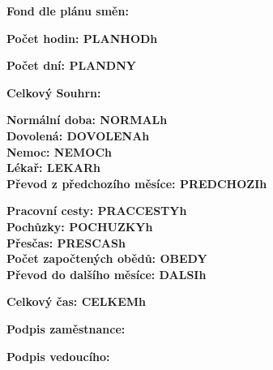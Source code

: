 \documentclass[10pt, a4paper]{article}%
\begin{document}
    
\begin{flushleft}%
    \Large\textbf{Fond dle plánu směn:\\}
    \vspace{0.3cm}

    \begin{minipage}{0.49\textwidth}
        \normalsize\textbf{Počet hodin: PLANHODh}\\
    \end{minipage}
    \hfill
    \begin{minipage}{0.49\textwidth}
        \normalsize\textbf{Počet dní: PLANDNY}\\

    \end{minipage}

    \vspace{0.3cm}
    \Large\textbf{Celkový Souhrn:\\}
    \vspace{0.3cm}

    \begin{minipage}{0.49\textwidth}
        \normalsize\textbf{Normální doba: NORMALh}\\
        \normalsize\textbf{Dovolená: DOVOLENAh}\\
        \normalsize\textbf{Nemoc: NEMOCh}\\
        \normalsize\textbf{Lékař: LEKARh}\\
        \normalsize\textbf{Převod z předchozího měsíce: PREDCHOZIh}
    \end{minipage}
    \hfill
    \begin{minipage}{0.49\textwidth}
        \normalsize\textbf{Pracovní cesty: PRACCESTYh}\\
        \normalsize\textbf{Pochůzky: POCHUZKYh}\\
        \normalsize\textbf{Přesčas: PRESCASh}\\
        \normalsize\textbf{Počet započtených obědů: OBEDY}\\
        \normalsize\textbf{Převod do dalšího měsíce: DALSIh}
    \end{minipage}

    \vspace{0.3cm}
    \Large\textbf{Celkový čas: CELKEMh}\\

\end{flushleft}


\vspace{2cm}
\begin{flushleft}%
    \begin{minipage}{0.49\textwidth}
        \normalsize\textbf{Podpis zaměstnance:\underline{\hspace{4cm}}}
    \end{minipage}
    \hfill
    \begin{minipage}{0.49\textwidth}
        \normalsize\textbf{Podpis vedoucího: \underline{\hspace{4cm}}}
    \end{minipage}


\end{flushleft}
\end{document}
